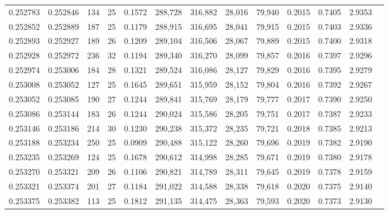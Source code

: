 \begin{tabular}{rrrrrrrrrrrrr}
0.252783 & 0.252846 &   134 &  25 &                                     0.1572 & 288,728 & 316,882 &  28,016 &  79,940 & 0.2015 & 0.7405 & 2.9353 \\
0.252852 & 0.252889 &   187 &  25 &                                     0.1179 & 288,915 & 316,695 &  28,041 &  79,915 & 0.2015 & 0.7403 & 2.9336 \\
0.252893 & 0.252927 &   189 &  26 &                                     0.1209 & 289,104 & 316,506 &  28,067 &  79,889 & 0.2015 & 0.7400 & 2.9318 \\
0.252928 & 0.252972 &   236 &  32 &                                     0.1194 & 289,340 & 316,270 &  28,099 &  79,857 & 0.2016 & 0.7397 & 2.9296 \\
0.252974 & 0.253006 &   184 &  28 &                                     0.1321 & 289,524 & 316,086 &  28,127 &  79,829 & 0.2016 & 0.7395 & 2.9279 \\
0.253008 & 0.253052 &   127 &  25 &                                     0.1645 & 289,651 & 315,959 &  28,152 &  79,804 & 0.2016 & 0.7392 & 2.9267 \\
0.253052 & 0.253085 &   190 &  27 &                                     0.1244 & 289,841 & 315,769 &  28,179 &  79,777 & 0.2017 & 0.7390 & 2.9250 \\
0.253086 & 0.253144 &   183 &  26 &                                     0.1244 & 290,024 & 315,586 &  28,205 &  79,751 & 0.2017 & 0.7387 & 2.9233 \\
0.253146 & 0.253186 &   214 &  30 &                                     0.1230 & 290,238 & 315,372 &  28,235 &  79,721 & 0.2018 & 0.7385 & 2.9213 \\
0.253188 & 0.253234 &   250 &  25 &                                     0.0909 & 290,488 & 315,122 &  28,260 &  79,696 & 0.2019 & 0.7382 & 2.9190 \\
0.253235 & 0.253269 &   124 &  25 &                                     0.1678 & 290,612 & 314,998 &  28,285 &  79,671 & 0.2019 & 0.7380 & 2.9178 \\
0.253270 & 0.253321 &   209 &  26 &                                     0.1106 & 290,821 & 314,789 &  28,311 &  79,645 & 0.2019 & 0.7378 & 2.9159 \\
0.253321 & 0.253374 &   201 &  27 &                                     0.1184 & 291,022 & 314,588 &  28,338 &  79,618 & 0.2020 & 0.7375 & 2.9140 \\
0.253375 & 0.253382 &   113 &  25 &                                     0.1812 & 291,135 & 314,475 &  28,363 &  79,593 & 0.2020 & 0.7373 & 2.9130 \\

\end{tabular}
